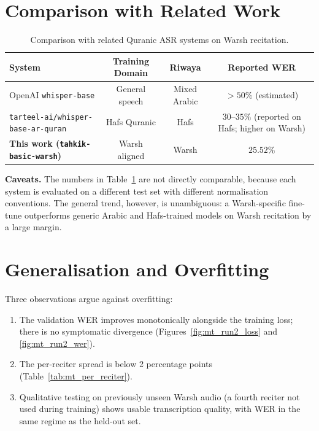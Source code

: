 \section{Comparison with Related Work}

\begin{table}[H]
  \centering
  \caption{Comparison with related Quranic ASR systems on Warsh
  recitation.}
  \label{tab:mt_related}
  \renewcommand{\arraystretch}{1.35}
  \begin{tabular}{lccc}
    \toprule
    \textbf{System} & \textbf{Training Domain} & \textbf{Riwaya} & \textbf{Reported WER} \\
    \midrule
    OpenAI \texttt{whisper-base}                & General speech       & Mixed Arabic & $> 50\%$ (estimated) \\
    \texttt{tarteel-ai/whisper-base-ar-quran}   & Hafs Quranic         & Hafs         & $30$--$35\%$ (reported on Hafs; higher on Warsh) \\
    \textbf{This work (\texttt{tahkik-basic-warsh})} & Warsh aligned    & Warsh        & $\mathbf{25.52\%}$ \\
    \bottomrule
  \end{tabular}
\end{table}

\textbf{Caveats.} The numbers in
Table~\ref{tab:mt_related} are not directly comparable, because each
system is evaluated on a different test set with different normalisation
conventions. The general trend, however, is unambiguous: a
Warsh-specific fine-tune outperforms generic Arabic and Hafs-trained
models on Warsh recitation by a large margin.

\section{Generalisation and Overfitting}

Three observations argue against overfitting:
\begin{enumerate}
  \item The validation WER improves monotonically alongside the
        training loss; there is no symptomatic divergence
        (Figures~\ref{fig:mt_run2_loss} and \ref{fig:mt_run2_wer}).
  \item The per-reciter spread is below 2 percentage points
        (Table~\ref{tab:mt_per_reciter}).
  \item Qualitative testing on previously unseen Warsh audio (a fourth
        reciter not used during training) shows usable transcription
        quality, with WER in the same regime as the held-out set.
\end{enumerate}

